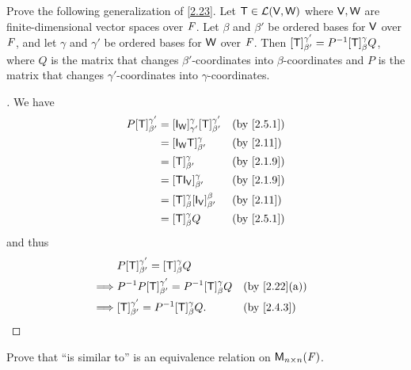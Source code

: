 \exercisesection

\setcounter{ex}{7}
\begin{ex}\label{ex:2.5.8}
	Prove the following generalization of \cref{2.23}.
	Let \(\mathsf{T} \in \mathcal{L}(\mathsf{V}, \mathsf{W})\) where \(\mathsf{V}, \mathsf{W}\) are finite-dimensional vector spaces over \(\mathit{F}\).
	Let \(\beta\) and \(\beta'\) be ordered bases for \(\mathsf{V}\) over \(\mathit{F}\), and let \(\gamma\) and \(\gamma'\) be ordered bases for \(\mathsf{W}\) over \(\mathit{F}\).
	Then \([\mathsf{T}]_{\beta'}^{\gamma'} = P^{-1} [\mathsf{T}]_{\beta}^{\gamma} Q\), where \(Q\) is the matrix that changes \(\beta'\)-coordinates into \(\beta\)-coordinates and \(P\) is the matrix that changes \(\gamma'\)-coordinates into \(\gamma\)-coordinates.
\end{ex}

\begin{proof}[]
	We have
	\begin{align*}
		P [\T]_{\beta'}^{\gamma'} & = [\IT[\W]]_{\gamma'}^{\gamma} [\T]_{\beta'}^{\gamma'} &  & \by{2.5.1} \\
		                          & = [\IT[\W] \T]_{\beta'}^{\gamma}                       &  & \by{2.11}  \\
		                          & = [\T]_{\beta'}^{\gamma}                               &  & \by{2.1.9} \\
		                          & = [\T \IT[\V]]_{\beta'}^{\gamma}                       &  & \by{2.1.9} \\
		                          & = [\T]_{\beta}^{\gamma} [\IT[\V]]_{\beta'}^{\beta}     &  & \by{2.11}  \\
		                          & = [\T]_{\beta}^{\gamma} Q                              &  & \by{2.5.1}
	\end{align*}
	and thus
	\begin{align*}
		         & P [\T]_{\beta'}^{\gamma'} = [\T]_{\beta}^{\gamma} Q                                 \\
		\implies & P^{-1} P [\T]_{\beta'}^{\gamma'} = P^{-1} [\T]_{\beta}^{\gamma} Q &  & \by{2.22}[a] \\
		\implies & [\T]_{\beta'}^{\gamma'} = P^{-1} [\T]_{\beta}^{\gamma} Q.         &  & \by{2.4.3}
	\end{align*}
\end{proof}

\begin{ex}\label{ex:2.5.9}
	Prove that ``is similar to'' is an equivalence relation on \(\ms[n][n][\F]\).
\end{ex}

